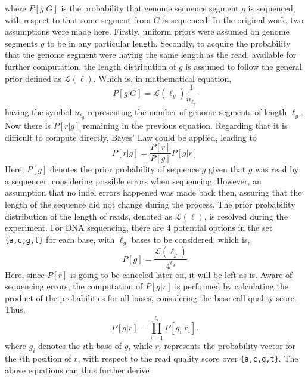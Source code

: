 \documentclass{PHlab-thesis}
\begin{document}
where $P[g|G]$ is the probability that genome sequence segment $g$ is sequenced, with respect to that some segment from $G$ is sequenced. In the original work, two assumptions were made here. Firstly, uniform priors were assumed on genome segments $g$ to be in any particular length. Secondly, to acquire the probability that the genome segment were having the same length as the read, available for further computation, the length distribution of $g$ is assumed to follow the general prior defined as $\mathcal{L}(\ell)$. Which is, in mathematical equation,
\begin{equation}
P[g|G] = \mathcal{L}(\ell_g) \frac{1}{n_{\ell_g}}
\end{equation}
having the symbol $n_{\ell_g}$ representing the number of genome segments of length $\ell_g$.
Now there is $P[r|g]$ remaining in the previous equation. Regarding that it is difficult to compute directly, Bayes' Law could be applied, leading to
\begin{equation}
P[r|g] = \frac{P[r]}{P[g]} P[g|r]
\end{equation}
Here, $P[g]$ denotes the prior probability of sequence $g$ given that $g$ was read by a sequencer, considering possible errors when sequencing. However, an assumption that no indel errors happened was made back then, assuring that the length of the sequence did not change during the process. The prior probability distribution of the length of reads, denoted as $\mathcal{L}(\ell)$, is resolved during the experiment. For DNA sequencing, there are 4 potential options in the set \texttt{\{a,c,g,t\}} for each base, with $\ell_g$ bases to be considered, which is,
\begin{equation}
P[g] =  \frac{\mathcal{L}(\ell_g)}{4^{\ell_g}}
\end{equation}
Here, since $P[r]$ is going to be canceled later on, it will be left as is. Aware of sequencing errors, the computation of $P[g|r]$ is performed by calculating the product of the probabilities for all bases, considering the base call quality score. Thus,
\begin{equation}
P[g|r] = \prod_{i=1}^{\ell_r} P[g_i|r_i].
\end{equation}
where $g_i$ denotes the $i$th base of $g$, while $r_i$ represents the probability vector for the $i$th position of $r$, with respect to the read quality score over \texttt{\{a,c,g,t\}}. The above equations can thus further derive
\end{document}
